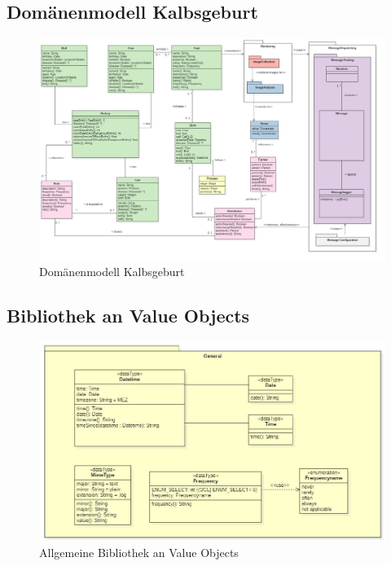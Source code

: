 \begin{landscape}

\subsection{Domänenmodell Kalbsgeburt}
\begin{figure}[H]
	\center
	\includegraphics[scale=0.38]{Grafiken/modelle/domain-birth.jpg}
	\caption{Domänenmodell Kalbsgeburt} 
	\label{fig: Domänenmodell Kalbsgeburt}
\end{figure}


\subsection{Bibliothek an Value Objects }


\begin{figure}[H]
	\center
	\includegraphics[scale=2]{Grafiken/modelle/vo-general.jpg}
	\caption{Allgemeine Bibliothek an Value Objects}
	\label{fig: Allgemeine Bibliothek an Value Objects}
\end{figure}
\end{landscape}
\restoregeometry %

